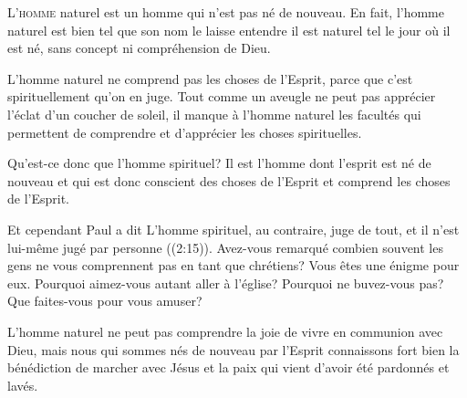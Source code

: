\dvrule







\lettrine{L}{'homme} naturel est un homme qui n'est pas né de nouveau.
 En fait, l'homme naturel est bien tel que son nom le laisse entendre
 \ocadr il est naturel tel le jour où il est né,
 sans concept ni compréhension de Dieu.

L'homme naturel ne comprend pas les choses de l'Esprit,
 parce que c'est spirituellement qu'on en juge.
 Tout comme un aveugle ne peut pas apprécier l'éclat d'un coucher de soleil,
 il manque à l'homme naturel les facultés qui permettent
 de comprendre et d'apprécier les choses spirituelles.


Qu'est-ce donc que l'homme spirituel?
 Il est l'homme dont l'esprit est né de nouveau
 et qui est donc conscient des choses de l'Esprit
 et comprend les choses de l'Esprit.

Et cependant Paul a dit\frcolon{} 
 \Og L'homme spirituel, au contraire, juge de tout,
 et il n'est lui-même jugé par personne \Fg{}
 ((2:15)).
 Avez-vous remarqué combien souvent les gens ne vous comprennent
 pas en tant que chrétiens? Vous êtes une énigme pour eux.
 \Og Pourquoi aimez-vous autant aller à l'église?
 Pourquoi ne buvez-vous pas? Que faites-vous pour vous amuser? \Fg{}

L'homme naturel ne peut pas comprendre la joie de vivre en communion avec Dieu,
 mais nous qui sommes nés de nouveau par l'Esprit connaissons
 fort bien la bénédiction de marcher avec Jésus
 \ocadr et la paix qui vient d'avoir été pardonnés et lavés.

